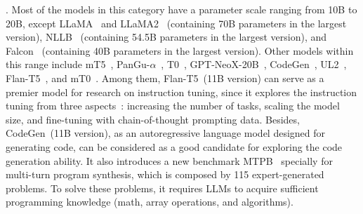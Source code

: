 . 
{Most of the models in  this category have a parameter scale ranging from 10B to 20B, {except LLaMA~\cite{Touvron-arxiv-2023-LLaMA} and LLaMA2~\cite{Touvron-2023-llama2-arxiv} (containing 70B parameters in the largest version)}, NLLB~\cite{Marta-arxiv-2022-NLLB} (containing 54.5B parameters in the largest version), and Falcon~\cite{Falcon40b} (containing 40B parameters in the largest version).  }
Other  models within this range include mT5~\cite{Xue-NAACL-2021-mT5}, PanGu-$\alpha$~\cite{Zeng-arxiv-2021-PanGualpha}, T0~\cite{Sanh-ICLR-2022-Multitask}, GPT-NeoX-20B~\cite{Black-CoRR-2022-GPT}, CodeGen~\cite{nijkamp-arxiv-2022-Codegen}, UL2~\cite{Tay-arxiv-2022-UL2}, Flan-T5~\cite{Chung-arxiv-2022-Scaling}, and mT0~\cite{Muennighoff-2022-arxiv-Crosslingual}.
Among them, Flan-T5~(11B version) can serve as a premier model for research on instruction tuning, since it explores the instruction tuning from three aspects~\cite{Chung-arxiv-2022-Scaling}: increasing the number of tasks, scaling the model size, and fine-tuning with chain-of-thought prompting data. 
Besides, CodeGen~(11B version), as an autoregressive language model designed for generating code, {can be considered as a good candidate for exploring the code generation ability.}
It also introduces a new benchmark MTPB~\cite{nijkamp-arxiv-2022-Codegen} specially for multi-turn program synthesis, which is composed by 115 expert-generated problems. To solve these problems, it requires LLMs to acquire sufficient programming knowledge (\eg math, array operations, and algorithms).  %
